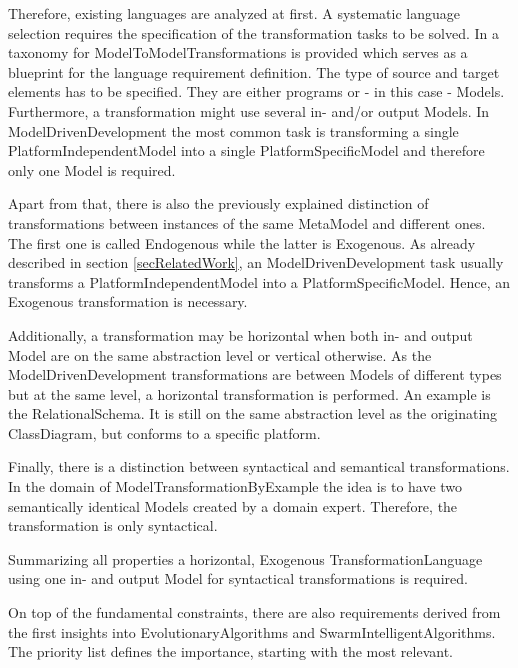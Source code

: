 Therefore, existing languages are analyzed at first. A systematic language selection requires the specification of the transformation tasks to be solved. In \cite{Mens2006} a taxonomy for \glspl{ModelToModelTransformation} is provided which serves as a blueprint for the language requirement definition. 
The type of source and target elements has to be specified. They are either programs or - in this case - \glspl{Model}. 
Furthermore, a transformation might use several in- and/or output \glspl{Model}. In \gls{ModelDrivenDevelopment} the most common task is transforming a single \gls{PlatformIndependentModel} into a single \gls{PlatformSpecificModel} and therefore only one \gls{Model} is required.

Apart from that, there is also the previously explained distinction of transformations between instances of the same \gls{MetaModel} and different ones. The first one is called \gls{Endogenous} while the latter is \gls{Exogenous}. As already described in section \ref{secRelatedWork}, an \gls{ModelDrivenDevelopment} task usually transforms a \gls{PlatformIndependentModel} into a \gls{PlatformSpecificModel}. Hence, an \gls{Exogenous} transformation is necessary.

Additionally, a transformation may be horizontal when both in- and output \gls{Model} are on the same abstraction level or vertical otherwise. As the \gls{ModelDrivenDevelopment} transformations are between \glspl{Model} of different types but at the same level, a horizontal transformation is performed. An example is the \gls{RelationalSchema}. It is still on the same abstraction level as the originating \gls{ClassDiagram}, but conforms to a specific platform.

Finally, there is a distinction between syntactical and semantical transformations. In the domain of \gls{ModelTransformationByExample} the idea is to have two semantically identical \glspl{Model} created by a domain expert. Therefore, the transformation is only syntactical. %

Summarizing all properties a horizontal, \gls{Exogenous} \gls{TransformationLanguage} using one in- and output \gls{Model} for syntactical transformations is required.

On top of the fundamental constraints, there are also requirements derived from the first insights into \glspl{EvolutionaryAlgorithm} and \glspl{SwarmIntelligentAlgorithm}. The priority list defines the importance, starting with the most relevant.

